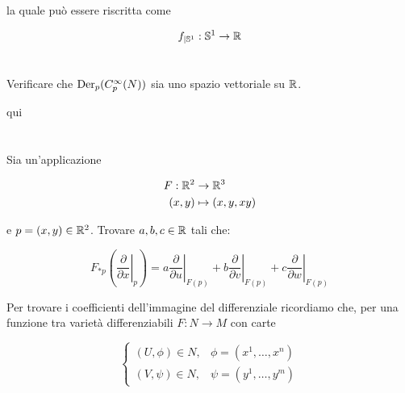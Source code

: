 la quale può essere riscritta come

\begin{equation}
	f_{|\mathbb{S}^{1}} : \mathbb{S}^{1} \to \mathbb{R}
\end{equation}

\tocless\section{}\label{BONUS2-2}

\begin{tcolorbox}
	Verificare che $ \operatorname{Der}_{p}(C_{p}^{\infty}(N)) $ sia uno spazio vettoriale su $ \mathbb{R} $.
\end{tcolorbox}

qui

\tocless\section{}\label{es2-8}

\begin{tcolorbox}
	Sia un'applicazione
	
	\begin{align}
		\begin{split}
			F : \mathbb{R}^{2} &\to \mathbb{R}^{3}\\
			(x,y) &\mapsto (x,y,xy)
		\end{split}
	\end{align}
	
	e $ p = (x,y) \in \mathbb{R}^{2} $. Trovare $ a,b,c \in \mathbb{R} $ tali che:
	
	\begin{equation}
		F_{*p} \left( \left. \dfrac{\partial}{\partial x} \right|_{p} \right) = a \left. \dfrac{\partial}{\partial u} \right|_{F(p)} + b \left. \dfrac{\partial}{\partial v} \right|_{F(p)} + c \left. \dfrac{\partial}{\partial w} \right|_{F(p)}
	\end{equation}
\end{tcolorbox}

Per trovare i coefficienti dell'immagine del differenziale ricordiamo che, per una funzione tra varietà differenziabili $ F : N \to M $ con carte

\begin{equation}
	\begin{cases}
		(U,\phi) \in N, & \phi = (x^{1},\dots,x^{n})\\
		(V,\psi) \in N, & \psi = (y^{1},\dots,y^{m})
	\end{cases}
\end{equation}

